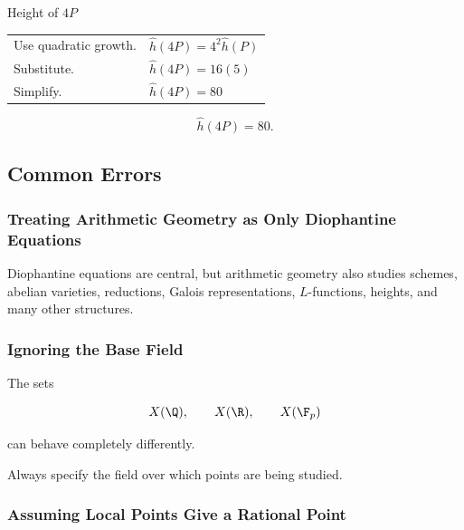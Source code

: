 \begin{workedexamplebox}{Height of \(4P\)}

\begin{tabularx}{\textwidth}{@{}>{\raggedright\arraybackslash}p{}X@{}}
Use quadratic growth. & \(\hat h(4P)=4^2\hat h(P)\)\\
Substitute. & \(\hat h(4P)=16(5)\)\\
Simplify. & \(\hat h(4P)=80\)
\end{tabularx}

\begin{answerbox}
\[ \boxed{\hat h(4P)=80.} \]
\end{answerbox}
\end{workedexamplebox}

\subsection{Common Errors}
\label{subsec:arithmetic-geometry-common-errors}

\subsubsection{Treating Arithmetic Geometry as Only Diophantine Equations}

Diophantine equations are central, but arithmetic geometry also studies
schemes, abelian varieties, reductions, Galois representations,
\(L\)-functions, heights, and many other structures.

\subsubsection{Ignoring the Base Field}

The sets

\[ X(\Q),\qquad X(\R),\qquad X(\F_p) \]

can behave completely differently.

Always specify the field over which points are being studied.

\subsubsection{Assuming Local Points Give a Rational Point}

